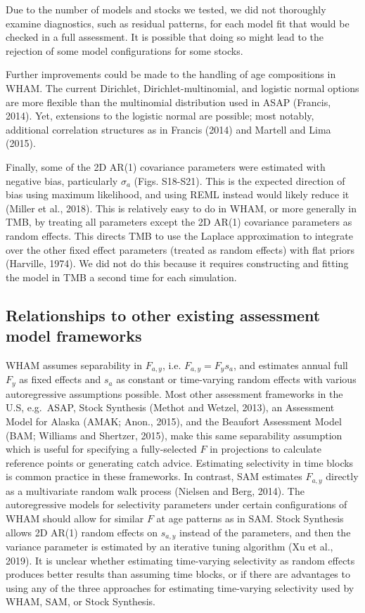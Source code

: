 \documentclass[]{article}
\begin{document}
Due to the number of models and stocks we tested, we did not thoroughly
examine diagnostics, such as residual patterns, for each model fit that
would be checked in a full assessment. It is possible that doing so
might lead to the rejection of some model configurations for some
stocks.

Further improvements could be made to the handling of age compositions
in WHAM. The current Dirichlet, Dirichlet-multinomial, and logistic
normal options are more flexible than the multinomial distribution used
in ASAP (Francis, 2014). Yet, extensions to the logistic normal are
possible; most notably, additional correlation structures as in Francis
(2014) and Martell and Lima (2015).

Finally, some of the 2D AR(1) covariance parameters were estimated with
negative bias, particularly \(\sigma_a\) (Figs. S18-S21). This is the
expected direction of bias using maximum likelihood, and using REML
instead would likely reduce it (Miller et al., 2018). This is relatively
easy to do in WHAM, or more generally in TMB, by treating all parameters
except the 2D AR(1) covariance parameters as random effects. This
directs TMB to use the Laplace approximation to integrate over the other
fixed effect parameters (treated as random effects) with flat priors
(Harville, 1974). We did not do this because it requires constructing
and fitting the model in TMB a second time for each simulation.

\hypertarget{relationships-to-other-existing-assessment-model-frameworks}{%
\subsection{Relationships to other existing assessment model
frameworks}\label{relationships-to-other-existing-assessment-model-frameworks}}

WHAM assumes separability in \(F_{a,y}\), i.e. \(F_{a,y} = F_y s_a\),
and estimates annual full \(F_y\) as fixed effects and \(s_a\) as
constant or time-varying random effects with various autoregressive
assumptions possible. Most other assessment frameworks in the U.S,
e.g.~ASAP, Stock Synthesis (Methot and Wetzel, 2013), an Assessment
Model for Alaska (AMAK; Anon., 2015), and the Beaufort Assessment Model
(BAM; Williams and Shertzer, 2015), make this same separability
assumption which is useful for specifying a fully-selected \(F\) in
projections to calculate reference points or generating catch advice.
Estimating selectivity in time blocks is common practice in these
frameworks. In contrast, SAM estimates \(F_{a,y}\) directly as a
multivariate random walk process (Nielsen and Berg, 2014). The
autoregressive models for selectivity parameters under certain
configurations of WHAM should allow for similar \(F\) at age patterns as
in SAM. Stock Synthesis allows 2D AR(1) random effects on \(s_{a,y}\)
instead of the parameters, and then the variance parameter is estimated
by an iterative tuning algorithm (Xu et al., 2019). It is unclear
whether estimating time-varying selectivity as random effects produces
better results than assuming time blocks, or if there are advantages to
using any of the three approaches for estimating time-varying
selectivity used by WHAM, SAM, or Stock Synthesis.
\end{document}
